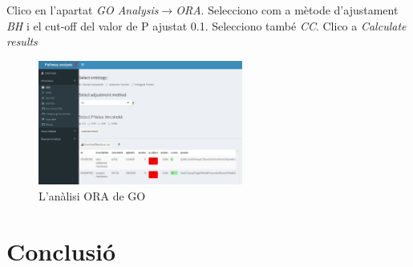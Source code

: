 Clico en l'apartat \textit{GO Analysis}$\rightarrow$\textit{ORA}. Selecciono com a mètode d'ajustament \textit{BH} i el cut-off del valor de P ajustat 0.1. Selecciono també \textit{CC}. Clico a \textit{Calculate results}
\begin{figure}[H]
\centering
\includegraphics[width=0.6\textwidth]{figures/Estudi1_Fig13_GO.png} 
\caption{L'anàlisi ORA de GO}
\end{figure}

\chapter{Conclusió}

